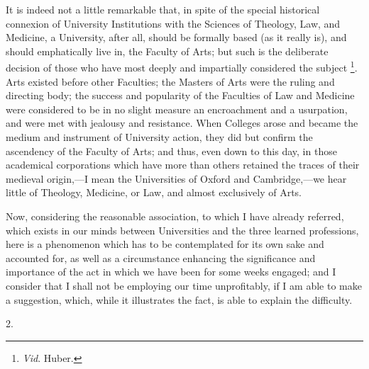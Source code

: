 It is indeed not a little remarkable that, in spite of the special
historical connexion of University Institutions with the Sciences of
Theology, Law, and Medicine, a University, after all, should be
formally based (as it really is), and should emphatically live in, the
Faculty of Arts; but such is the deliberate decision of those who have
most deeply and impartially considered the subject \footnote{\emph{Vid}. Huber.}. Arts existed before other Faculties; the Masters of Arts were
the ruling and directing body; the success and popularity of the
Faculties of Law and Medicine were considered to be in no slight
measure an encroachment and a usurpation, and were met with jealousy
and resistance. When Colleges arose and became the medium and
instrument of University action, they did but confirm the ascendency
of the Faculty of Arts; and thus, even down to this day, in those
academical corporations which have more than others retained the
traces of their medieval origin,—I mean the Universities of Oxford
and Cambridge,—we hear little of Theology, Medicine, or Law, and
almost exclusively of Arts.

Now, considering the reasonable association, to which I have
already referred, which exists in our minds between Universities and
the three learned professions, here is a phenomenon which has to be
contemplated for its own sake and accounted for, as well as a
circumstance enhancing the significance and importance of the act in
which we have been for some weeks engaged; and I consider that I shall
not be employing our time unprofitably, if I am able to make a
suggestion, which, while it illustrates the fact, is able to explain
the difficulty.

2.

